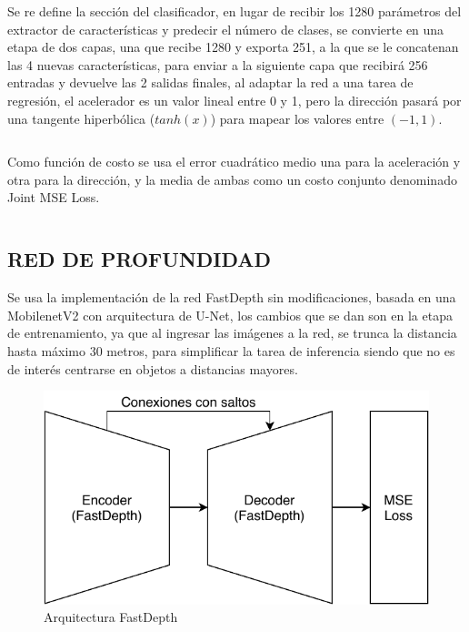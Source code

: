 		Se re define la sección del clasificador, en lugar de recibir los 1280 parámetros del extractor de características y predecir el número de clases, se convierte en una etapa de dos capas, una que recibe 1280 y exporta 251, a la que se le concatenan las 4 nuevas características, para enviar a la siguiente capa que recibirá 256 entradas y devuelve las 2 salidas finales, al adaptar la red a una tarea de regresión, el acelerador es un valor lineal entre 0 y 1, pero la dirección pasará por una tangente hiperbólica ($tanh(x)$) para mapear los valores entre $(-1, 1)$.
		
		\inputminted[frame=lines,
		baselinestretch=1,
		fontsize=\footnotesize,
		autogobble]{python}{codigos/marco-aplicativo/drivenet_capas.py}
		
		Como función de costo se usa el error cuadrático medio una para la aceleración y otra para la dirección, y la media de ambas como un costo conjunto denominado Joint MSE Loss.
		
		\inputminted[frame=lines,
		baselinestretch=1,
		fontsize=\footnotesize,
		autogobble]{python}{codigos/marco-aplicativo/drivenet_forward.py}
		
	\subsection{RED DE PROFUNDIDAD}
		Se usa la implementación de la red FastDepth sin modificaciones, basada en una MobilenetV2 con arquitectura de U-Net, los cambios que se dan son en la etapa de entrenamiento, ya que al ingresar las imágenes a la red, se trunca la distancia hasta máximo 30 metros, para simplificar la tarea de inferencia siendo que no es de interés centrarse en objetos a distancias mayores.
		
		\begin{figure}[H]
			\centering
			\includegraphics[scale=0.6]{imagenes/depthnet}
			\caption{Arquitectura FastDepth}
			\label{depthnet}
		\end{figure}
		
